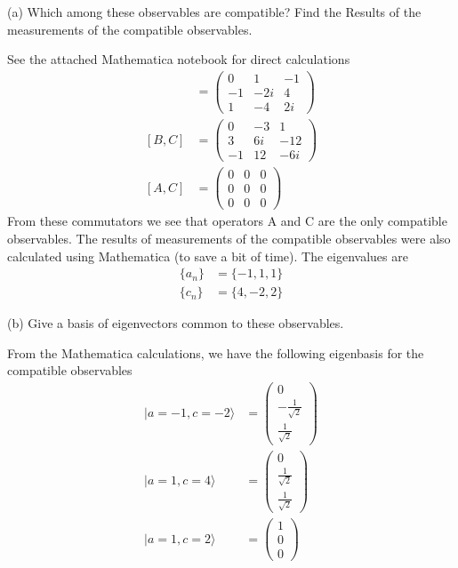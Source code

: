 \documentclass[a4paper, 11pt]{article}
\newcommand{\ket}[1]{|#1\rangle}
\newenvironment{solution}{%
	\begin{list}{}{%
			\setlength{\topsep}{0pt}%
			\setlength{\leftmargin}{1.5cm}%
			\setlength{\rightmargin}{1.5cm}%
			\setlength{\listparindent}{\parindent}%
			\setlength{\itemindent}{\parindent}%
			\setlength{\parsep}{\parskip}%
		}%
		\item[]}{\end{list}}
\begin{document}
\noindent (a) Which among these observables are compatible? Find the Results of the measurements of the compatible observables. 
	\begin{solution}
		See the attached Mathematica notebook for direct calculations 
			\begin{align*}
				[A, B] &= \begin{pmatrix}
					0 & 1 & -1 \\ 
					-1 & -2i & 4 \\ 
					1 & -4 & 2i
				\end{pmatrix} \\ 
				[B, C] &= \begin{pmatrix}
					0 & -3 & 1 \\ 
					3 & 6i & -12 \\ 
					-1 & 12 & -6i
				\end{pmatrix} \\ 
				[A,C] &= \begin{pmatrix}
					0 & 0 & 0 \\ 
					0 & 0 & 0 \\ 
					0 & 0 & 0 
				\end{pmatrix}
			\end{align*}
		From these commutators we see that operators A and C are the only compatible observables. The results of measurements of the compatible observables were also calculated using Mathematica (to save a bit of time). The eigenvalues are
			\begin{align*}
				\{a_n\} &= \{-1, 1, 1\} \\ 
				\{c_n\} &= \{4, -2, 2\}
			\end{align*}
	\end{solution}

\noindent (b) Give a basis of eigenvectors common to these observables. 
	\begin{solution}
		From the Mathematica calculations, we have the following eigenbasis for the compatible observables
			\begin{align*}
				\ket{a=-1, c=-2} &= \begin{pmatrix} 0 \\ -\frac{1}{\sqrt{2}} \\ \frac{1}{\sqrt{2}} \end{pmatrix} \\ 
				\ket{a=1, c=4} &= \begin{pmatrix}0 \\ \frac{1}{\sqrt{2}} \\ \frac{1}{\sqrt{2}}  \end{pmatrix} \\ 
				\ket{a=1, c=2} &= \begin{pmatrix} 1 \\ 0 \\ 0 \end{pmatrix}
			\end{align*}
	\end{solution}
\end{document}
